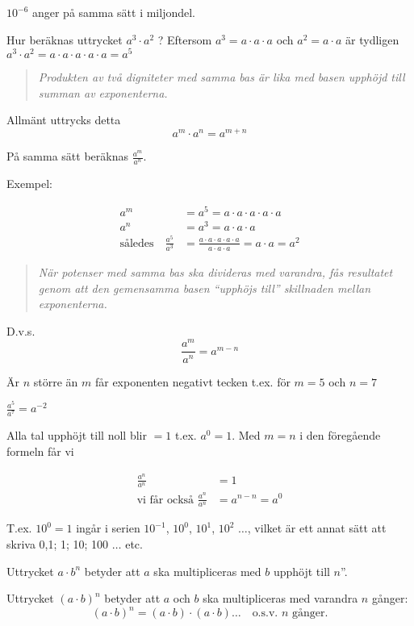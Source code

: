 \(10^{-6}\) anger på samma sätt i miljondel.

Hur beräknas uttrycket \(a^3 \cdot a^2\) ?
Eftersom \(a^3 = a \cdot a \cdot a\) och \(a^2 = a \cdot a\) är tydligen
\(a^3 \cdot a^2 = a \cdot a \cdot a \cdot a \cdot a = a^5\)

\begin{quote}\emph{Produkten av två digniteter med samma bas är lika med basen
    upphöjd till summan av exponenterna.}\end{quote}

Allmänt uttrycks detta \[a^m \cdot a^n = a^{m+n}\]

På samma sätt beräknas \(\frac{a^m}{a^n}\).

Exempel:

\begin{align*}
a^m &= a^5 = a \cdot a \cdot a \cdot a \cdot a \\
a^n &= a^3 = a \cdot a \cdot a \\
\text{således} \quad
\frac{a^5}{a^3}&=\frac{a \cdot a \cdot a \cdot a \cdot a}{a \cdot a \cdot a} =
a \cdot a = a^2
\end{align*}

\begin{quote}\emph{När potenser med samma bas ska divideras med varandra, fås
resultatet genom att den gemensamma basen ``upphöjs till'' skillnaden mellan
exponenterna.}\end{quote}

D.v.s. \[\frac{a^m}{a^n} = a^{m-n}\]

Är \(n\) större än \(m\) får exponenten negativt tecken t.ex. för \(m = 5\) och \(n = 7\)

\(\frac{a^5}{a^7} = a^{-2}\)

Alla tal upphöjt till noll blir \(= 1\) t.ex. \(a^0 = 1\).
Med \(m = n\) i den föregående formeln får vi

\begin{align*}
  \frac{a^n}{a^n} &= 1 \\
  \text{vi får också }\frac{a^n}{a^n} &= a^{n-n} =a^0
\end{align*}

T.ex. \(10^0 = 1\) ingår i serien \(10^{-1}\), \(10^0\), \(10^1\), \(10^2\)
\(\ldots\), vilket
är ett annat sätt att skriva 0,1; 1; 10; 100 \(\ldots\) etc.

Uttrycket \(a \cdot b^n\) betyder att \(a\) ska multipliceras med \(b\) upphöjt
till \(n\)''.

Uttrycket \((a \cdot b)^n\) betyder att \(a\) och \(b\) ska multipliceras med
varandra \(n\) gånger:
\[
(a \cdot b)^n = (a \cdot b) \cdot (a \cdot b) \ldots
\quad \text{o.s.v. }n\text{ gånger.}
\]

